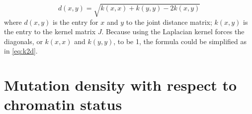 \begin{equation}
    d(x,y) = \sqrt{k(x,x) + k(y,y) - 2k(x,y)} 
    \label{eq:k2d_ori}
\end{equation}
where $d(x,y)$ is the entry for $x$ and $y$ to the joint distance matrix; $k(x,y)$ is the entry to the kernel matrix $J$. Because using the Laplacian kernel forces the diagonals, or $k(x,x)$ and $k(y,y)$, to be 1, the formula could be simplified as in \ref{eq:k2d}.

\newpage
\section{Mutation density with respect to chromatin status}







